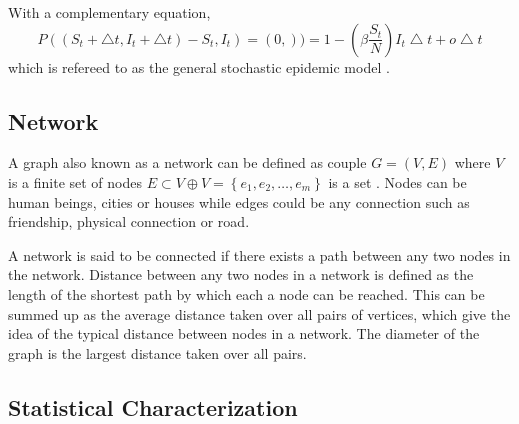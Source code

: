 With a complementary equation,
\begin{equation}
P((S_t + \bigtriangleup t, I_t+ \bigtriangleup t) - S_t, I_t) =(0,)) = 1 -\left( \beta \dfrac{ S_t}{N}\right) I_t \bigtriangleup t + o\bigtriangleup t
\end{equation}
which is refereed to as the general stochastic  epidemic model \cite{greenwood2009stochastic}.

\subsection{Network}


A graph also known as a network can be defined as couple $G = (V, E) $ where $V$ is a finite set of nodes $E \subset V \oplus V = \left\lbrace e_1,e_2,\dots, e_m \right\rbrace$ is a set \citep{estrada2012structure}. Nodes can be human beings, cities or houses while edges could be any connection such as friendship, physical connection or road.

A network is said to be connected if there exists a path between any two nodes in the network. Distance between any two nodes in a network is defined as the length of the shortest path by which each a node can be reached.
This can be summed up as the average distance taken over all pairs of vertices, which give the idea of the typical distance between nodes in a network. The diameter of the graph is the largest distance taken over all pairs.

\subsection{Statistical Characterization}
 
